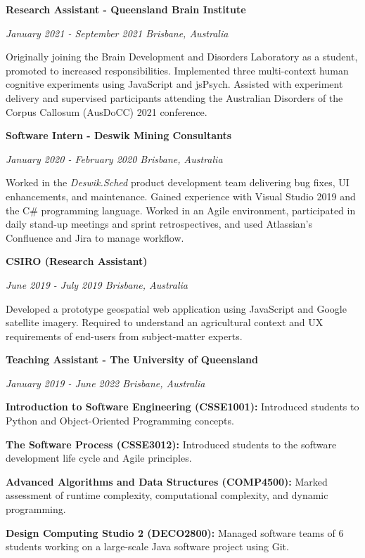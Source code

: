 \documentclass{article}
\begin{document}
  {\large\textbf{Research Assistant - Queensland Brain Institute}}

  \textit{January 2021 - September 2021 \hfill Brisbane, Australia}

  Originally joining the Brain Development and Disorders Laboratory as a student, promoted to increased responsibilities. Implemented three multi-context human cognitive experiments using JavaScript and jsPsych. Assisted with experiment delivery and supervised participants attending the Australian Disorders of the Corpus Callosum (AusDoCC) 2021 conference.

  \medbreak

  {\large\textbf{Software Intern - Deswik Mining Consultants}}

  \textit{January 2020 - February 2020 \hfill Brisbane, Australia}

  Worked in the \textit{Deswik.Sched} product development team delivering bug fixes, UI enhancements, and maintenance. Gained experience with Visual Studio 2019 and the C\# programming language. Worked in an Agile environment, participated in daily stand-up meetings and sprint retrospectives, and used Atlassian's Confluence and Jira to manage workflow.

  \medbreak

  {\large\textbf{CSIRO (Research Assistant)}}

  \textit{June 2019 - July 2019 \hfill Brisbane, Australia}

  Developed a prototype geospatial web application using JavaScript and Google satellite imagery. Required to understand an agricultural context and UX requirements of end-users from subject-matter experts.

  \pagebreak

  {\large\textbf{Teaching Assistant - The University of Queensland}}

  \textit{January 2019 - June 2022 \hfill Brisbane, Australia}

  \textbf{Introduction to Software Engineering (CSSE1001):} Introduced students to Python and Object-Oriented Programming concepts.

  \textbf{The Software Process (CSSE3012):} Introduced students to the software development life cycle and Agile principles.

  \textbf{Advanced Algorithms and Data Structures (COMP4500):} Marked assessment of runtime complexity, computational complexity, and dynamic programming.

  \textbf{Design Computing Studio 2 (DECO2800):} Managed software teams of 6 students working on a large-scale Java software project using Git.
\end{document}
